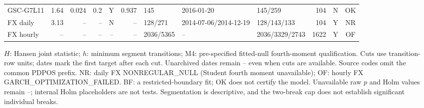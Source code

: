 \begin{longtable}{lrrrcrlllrcc}
GSC-G7L11 & 1.64 & 0.024 & 0.2 & Y & 0.937 & 145 & 2016-01-20 & 145/259 & 104 & N & OK\\
FX daily & 3.13 & -- & -- & N & -- & 128/271 & 2014-07-06/2014-12-19 & 128/143/133 & 104 & Y & NR\\
FX hourly & -- & -- & -- & -- & -- & 2036/5365 & -- & 2036/3329/2743 & 1622 & Y & OF\\
\end{longtable}
\noindent\parbox{\linewidth}{\fontsize{8}{9.2}\selectfont $H$: Hansen joint statistic; $h$: minimum segment transitions; M4: pre-specified fitted-null fourth-moment qualification. Cuts use transition-row units; dates mark the first target after each cut. Unarchived dates remain -- even when cuts are available. Source codes omit the common PDPOS prefix. NR: daily FX NONREGULAR\_NULL (Student fourth moment unavailable); OF: hourly FX GARCH\_OPTIMIZATION\_FAILED. BF: a restricted-boundary fit; OK does not certify the model. Unavailable raw $p$ and Holm values remain --; internal Holm placeholders are not tests. Segmentation is descriptive, and the two-break cap does not establish significant individual breaks.}
\endgroup
